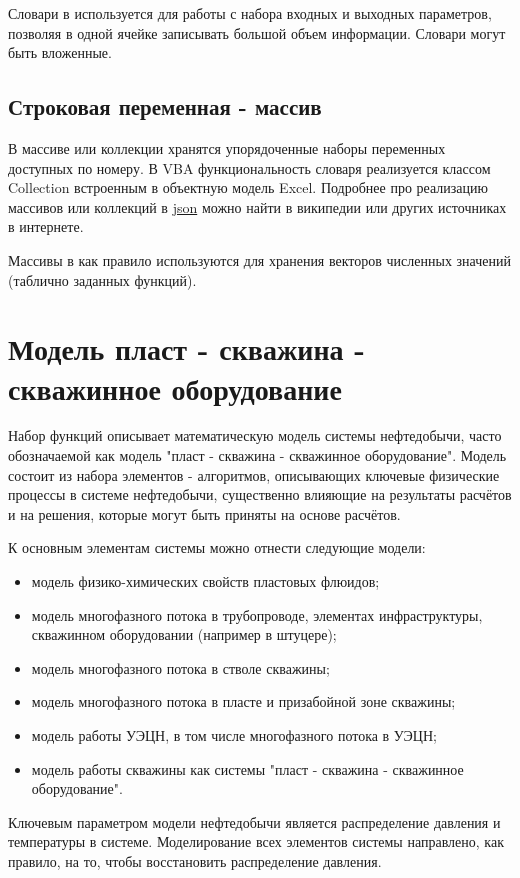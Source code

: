 Словари в \unf{} используется для работы с набора входных и выходных параметров, позволяя в одной ячейке записывать большой объем информации. Словари могут быть вложенные.

\subsection{Строковая переменная - массив}
В массиве или коллекции хранятся упорядоченные наборы переменных доступных по номеру. В VBA функциональность словаря реализуется классом Collection встроенным в объектную модель Excel. Подробнее про реализацию массивов или коллекций в \href{https://ru.wikipedia.org/wiki/JSON}{json} можно найти в википедии или других источниках в интернете.

Массивы в \unf{} как правило используются для хранения векторов численных значений (таблично заданных функций).

\section{Модель пласт - скважина - скважинное оборудование}

Набор функций \unf{} описывает математическую модель системы нефтедобычи, часто обозначаемой как модель "пласт - скважина - скважинное оборудование". Модель состоит из набора элементов - алгоритмов, описывающих ключевые физические процессы в системе нефтедобычи, существенно влияющие на результаты расчётов и на решения, которые могут быть приняты на основе расчётов.

К основным элементам системы можно отнести следующие модели:
\begin{itemize}
	\item модель физико-химических свойств пластовых флюидов;
	\item модель многофазного потока в трубопроводе, элементах инфраструктуры, скважинном оборудовании (например в штуцере);
	\item модель многофазного потока в стволе скважины;
	\item модель многофазного потока в пласте и призабойной зоне скважины;
	\item модель работы УЭЦН, в том числе многофазного потока в УЭЦН;
	\item модель работы скважины как системы "пласт - скважина - скважинное оборудование".
\end{itemize}

Ключевым параметром модели нефтедобычи является распределение давления и температуры в системе. Моделирование всех элементов системы направлено, как правило, на то, чтобы восстановить распределение давления.

